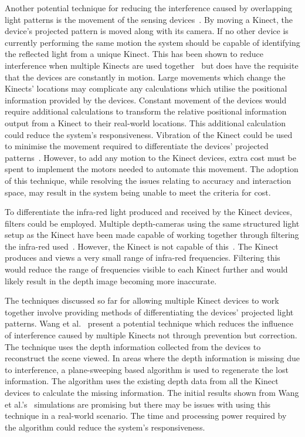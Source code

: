 \documentclass[link]{IWCOMP}
\begin{document}
Another potential technique for reducing the interference caused by overlapping light patterns is the movement of the sensing devices~\citep{Maimone2012}.
By moving a Kinect, the device's projected pattern is moved along with its camera.
If no other device is currently performing the same motion the system should be capable of identifying the reflected light from a unique Kinect.
This has been shown to reduce interference when multiple Kinects are used together~\citep{Maimone2012} but does have the requisite that the devices are constantly in motion.
Large movements which change the Kinects' locations may complicate any calculations which utilise the positional information provided by the devices.
Constant movement of the devices would require additional calculations to transform the relative positional information output from a Kinect to their real-world locations.
This additional calculation could reduce the system's responsiveness.
Vibration of the Kinect could be used to minimise the movement required to differentiate the devices' projected patterns~\citep{Kainz2012}.
However, to add any motion to the Kinect devices, extra cost must be spent to implement the motors needed to automate this movement.
The adoption of this technique, while resolving the issues relating to accuracy and interaction space, may result in the system being unable to meet the criteria for cost.

To differentiate the infra-red light produced and received by the Kinect devices, filters could be employed.
Multiple depth-cameras using the same structured light setup as the Kinect have been made capable of working together through filtering the infra-red used~\citep{Kim2008}.
However, the Kinect is not capable of this~\citep{Kainz2012}.
The Kinect produces and views a very small range of infra-red frequencies.
Filtering this would reduce the range of frequencies visible to each Kinect further and would likely result in the depth image becoming more inaccurate.

The techniques discussed so far for allowing multiple Kinect devices to work together involve providing methods of differentiating the devices' projected light patterns.
Wang et al.~\citep{Wang2012} present a potential technique which reduces the influence of interference caused by multiple Kinects not through prevention but correction.
The technique uses the depth information collected from the devices to reconstruct the scene viewed.
In areas where the depth information is missing due to interference, a plane-sweeping based algorithm is used to regenerate the lost information.
The algorithm uses the existing depth data from all the Kinect devices to calculate the missing information.
The initial results shown from Wang et al.'s~\citep{Wang2012} simulations are promising but there may be issues with using this technique in a real-world scenario.
The time and processing power required by the algorithm could reduce the system's responsiveness.
\end{document}
